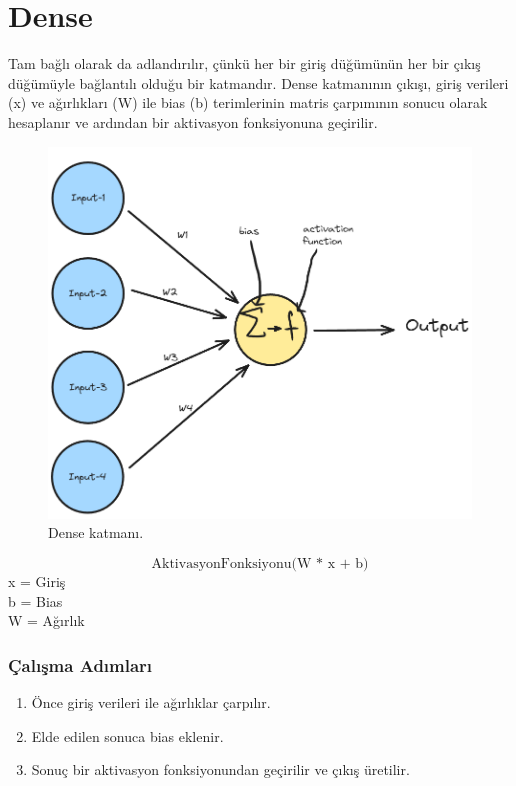 \section{Dense}
Tam bağlı olarak da adlandırılır, çünkü her bir giriş düğümünün her bir çıkış düğümüyle bağlantılı olduğu bir katmandır. Dense katmanının çıkışı, giriş verileri (x) ve ağırlıkları (W) ile bias (b) terimlerinin matris çarpımının sonucu olarak hesaplanır ve ardından bir aktivasyon fonksiyonuna geçirilir.

\begin{figure}[h]
    \centering
    \includegraphics[width=1\textwidth]{images/dense_layer.png}
    \caption{Dense katmanı.}
    \label{fig:enter-label}
\end{figure}

\[\text{AktivasyonFonksiyonu(W * x + b)}\]
x = Giriş \\
b = Bias \\
W = Ağırlık \\

\subsubsection{Çalışma Adımları}
\begin{enumerate}
    \item Önce giriş verileri ile ağırlıklar çarpılır.
    \item Elde edilen sonuca bias eklenir.
    \item Sonuç bir aktivasyon fonksiyonundan geçirilir ve çıkış üretilir.
\end{enumerate}


